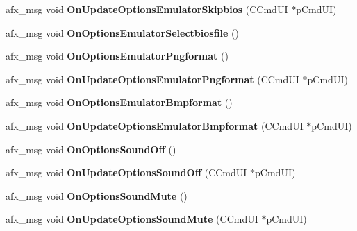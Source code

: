 \begin{DoxyCompactItemize}
\item 
\mbox{\label{class_main_wnd_a6808315740b4fa5adcd51384dff66b2a}} 
afx\+\_\+msg void {\bfseries On\+Update\+Options\+Emulator\+Skipbios} (C\+Cmd\+UI $\ast$p\+Cmd\+UI)
\item 
\mbox{\label{class_main_wnd_a7a3ee694ccb8d2fd21066b71d93cef22}} 
afx\+\_\+msg void {\bfseries On\+Options\+Emulator\+Selectbiosfile} ()
\item 
\mbox{\label{class_main_wnd_a7b6bec3286f6833167cd6e6adfcf39e0}} 
afx\+\_\+msg void {\bfseries On\+Options\+Emulator\+Pngformat} ()
\item 
\mbox{\label{class_main_wnd_aaf6f0e9673e24e2137d2bdf8527a2a1a}} 
afx\+\_\+msg void {\bfseries On\+Update\+Options\+Emulator\+Pngformat} (C\+Cmd\+UI $\ast$p\+Cmd\+UI)
\item 
\mbox{\label{class_main_wnd_abbfe0cda67be481a746de75493b6af07}} 
afx\+\_\+msg void {\bfseries On\+Options\+Emulator\+Bmpformat} ()
\item 
\mbox{\label{class_main_wnd_a2db751ffefb04f3b4d337e29f6d1da7d}} 
afx\+\_\+msg void {\bfseries On\+Update\+Options\+Emulator\+Bmpformat} (C\+Cmd\+UI $\ast$p\+Cmd\+UI)
\item 
\mbox{\label{class_main_wnd_a4d0172fc524e4d24d039ac5050acf160}} 
afx\+\_\+msg void {\bfseries On\+Options\+Sound\+Off} ()
\item 
\mbox{\label{class_main_wnd_a5c80e54eef1bc1e6cd6d00f2c196c2c0}} 
afx\+\_\+msg void {\bfseries On\+Update\+Options\+Sound\+Off} (C\+Cmd\+UI $\ast$p\+Cmd\+UI)
\item 
\mbox{\label{class_main_wnd_affac8ac6a130bb9f388c6d4148ae1a0d}} 
afx\+\_\+msg void {\bfseries On\+Options\+Sound\+Mute} ()
\item 
\mbox{\label{class_main_wnd_a63964846dcc81703c9041f4b4c6d92c2}} 
afx\+\_\+msg void {\bfseries On\+Update\+Options\+Sound\+Mute} (C\+Cmd\+UI $\ast$p\+Cmd\+UI)
\item 
\mbox{\label{class_main_wnd_a98e970e0bfd8e8bdfd58b5bf6068d75f}} 

\end{DoxyCompactItemize}
